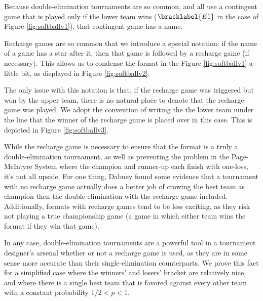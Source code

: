 {    Because double-elimination tournaments are so common, and all use a contingent game that is played only if the lower team wins ($\bracklabel{E1}$ in the case of Figure \ref{fig:softballv1}), that contingent game has a name.


    Recharge games are so common that we introduce a special notation: if the name of a game has a star after it, then that game is followed by a recharge game (if necessary). This allows us to condense the format in the Figure \ref{fig:softballv1} a little bit, as displayed in Figure \ref{fig:softballv2}.


    The only issue with this notation is that, if the recharge game was triggered but won by the upper team, there is no natural place to denote that the recharge game was played. We adopt the convention of writing the the lower team \i{under} the line that the winner of the recharge game is placed over in this case. This is depicted in Figure \ref{fig:softballv3}.
    

    While the recharge game is necessary to ensure that the format is a truly a double-elimination tournament, as well as preventing the problem in the Page-McIntyre System where the champion and runner-up each finish with one-loss, it's not all upside. For one thing, Dabney \cite{recharge_rounds} found some evidence that a tournament with no recharge game actually does a better job of crowing the best team as champion then the double-elimination with the recharge game included. Additionally, formats with recharge games tend to be less exciting, as they risk not playing a true championship game (a game in which either team wins the format if they win that game).

    In any case, double-elimination tournaments are a powerful tool in a tournament designer's arsenal whether or not a recharge game is used, as they are in some sense more accurate than their single-elimination counterparts. We prove this fact for a simplified case where the winners' and losers' bracket are relatively nice, and where there is a single best team that is favored against every other team with a constant probability $1/2 < p < 1$.

}
